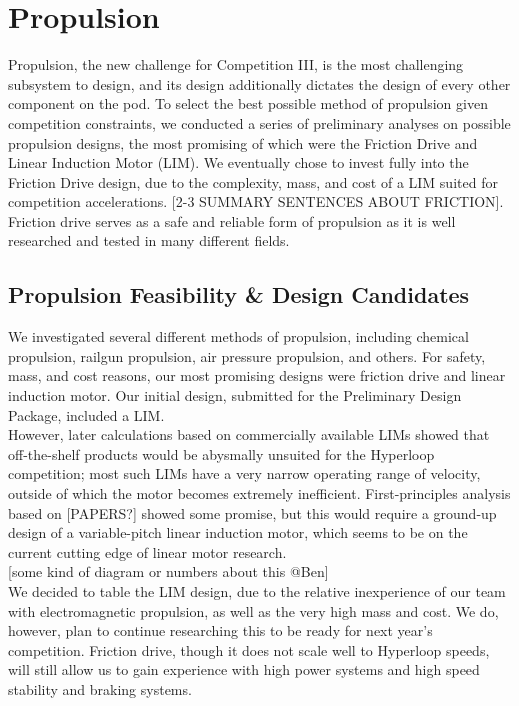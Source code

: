 \documentclass[main.tex]{subfiles}
\begin{document}
    \section{Propulsion}
    Propulsion, the new challenge for Competition III, is the most challenging subsystem to design, and its design additionally dictates the design of every other component on the pod. To select the best possible method of propulsion given competition constraints, we conducted a series of preliminary analyses on possible propulsion designs, the most promising of which were the Friction Drive and Linear Induction Motor (LIM). We eventually chose to invest fully into the Friction Drive design, due to the complexity, mass, and cost of a LIM suited for competition accelerations. [2-3 SUMMARY SENTENCES ABOUT FRICTION]. Friction drive serves as a safe and reliable form of propulsion as it is well researched and tested in many different fields.

    \subsection{Propulsion Feasibility \& Design Candidates}
    We investigated several different methods of propulsion, including chemical propulsion, railgun propulsion, air pressure propulsion, and others. For safety, mass, and cost reasons, our most promising designs were friction drive and linear induction motor. Our initial design, submitted for the Preliminary Design Package, included a LIM.\\

    However, later calculations based on commercially available LIMs showed that off-the-shelf products would be abysmally unsuited for the Hyperloop competition; most such LIMs have a very narrow operating range of velocity, outside of which the motor becomes extremely inefficient. First-principles analysis based on [PAPERS?] showed some promise, but this would require a ground-up design of a variable-pitch linear induction motor, which seems to be on the current cutting edge of linear motor research.\\

    [some kind of diagram or numbers about this @Ben]\\

    We decided to table the LIM design, due to the relative inexperience of our team with electromagnetic propulsion, as well as the very high mass and cost. We do, however, plan to continue researching this to be ready for next year’s competition. Friction drive, though it does not scale well to Hyperloop speeds, will still allow us to gain experience with high power systems and high speed stability and braking systems.\\
\end{document}
